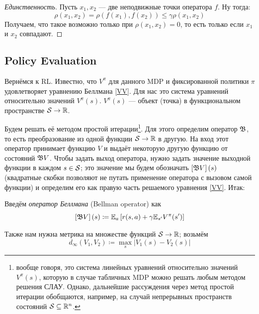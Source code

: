 \begin{theorem}
\begin{proof}[Единственность] Пусть $x_1, x_2$ --- две неподвижные точки оператора $f$. Ну тогда:
$$\rho(x_1, x_2) = \rho(f(x_1), f(x_2)) \le \gamma \rho(x_1, x_2)$$
Получаем, что такое возможно только при $\rho(x_1, x_2) = 0$, то есть только если $x_1$ и $x_2$ совпадают.
\end{proof}
\end{theorem}


\subsection{Policy Evaluation}

Вернёмся к RL. Известно, что $V^\pi$ для данного MDP и фиксированной политики $\pi$ удовлетворяет уравнению Беллмана \eqref{VV}. Для нас это система уравнений относительно значений $V^\pi(s)$. $V^\pi(s)$ --- объект (точка) в функциональном пространстве $\mathcal{S} \to \mathbb{R}$.

Будем решать её методом простой итерации\footnote{вообще говоря, это система линейных уравнений относительно значений $V^\pi(s)$, которую в случае табличных MDP можно решать любым методом решения СЛАУ. Однако, дальнейшие рассуждения через метод простой итерации обобщаются, например, на случай непрерывных пространств состояний $\mathcal{S} \subseteq \mathbb{R}^n$.}. Для этого определим оператор $\mathfrak{B}$, то есть преобразование из одной функции $\mathcal{S} \to \mathbb{R}$ в другую. На вход этот оператор принимает функцию $V$ и выдаёт некоторую другую функцию от состояний $\mathfrak{B} V$. Чтобы задать выход оператора, нужно задать значение выходной функции в каждом $s \in \mathcal{S}$; это значение мы будем обозначать $\left[\mathfrak{B} V\right] (s)$ (квадратные скобки позволяют не путать применение оператора с вызовом самой функции) и определим его как правую часть решаемого уравнения \eqref{VV}. Итак:

\begin{definition}
Введём \emph{оператор Беллмана} (Bellman operator) как
$$\left[\mathfrak{B} V\right] (s) \coloneqq \mathbb{E}_{a} \left[ r(s, a) + \gamma \mathbb{E}_{s'} V^\pi(s') \right]$$
\end{definition}

Также нам нужна метрика на множестве функций $\mathcal{S} \to \mathbb{R}$; возьмём
$$d_\infty(V_1, V_2) \coloneqq \max_s | V_1(s) - V_2(s) |$$

